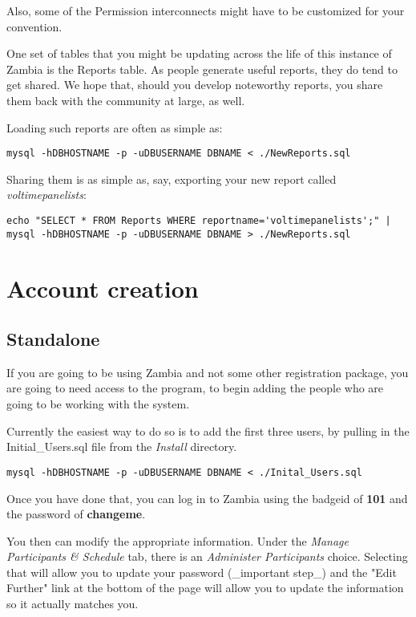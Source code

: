 \documentclass[captions=tablesignature]{scrartcl}
\begin{document}
Also, some of the Permission interconnects might have to be
customized for your convention.

One set of tables that you might be updating across the life of this
instance of Zambia is the Reports table.  As people generate useful
reports, they do tend to get shared.  We hope that, should you
develop noteworthy reports, you share them back with the community
at large, as well.

Loading such reports are often as simple as:
\begin{verbatim}
mysql -hDBHOSTNAME -p -uDBUSERNAME DBNAME < ./NewReports.sql
\end{verbatim}

Sharing them is as simple as, say, exporting your new report called
\emph{voltimepanelists}:
\begin{verbatim}
echo "SELECT * FROM Reports WHERE reportname='voltimepanelists';" |
mysql -hDBHOSTNAME -p -uDBUSERNAME DBNAME > ./NewReports.sql
\end{verbatim}
\section{Account creation}
\label{sec-7}
\subsection{Standalone}
\label{sec-7-1}
If you are going to be using Zambia and not some other registration
package, you are going to need access to the program, to begin
adding the people who are going to be working with the system.

Currently the easiest way to do so is to add the first three users,
by pulling in the Initial\_Users.sql file from the \emph{Install}
directory.

\begin{verbatim}
mysql -hDBHOSTNAME -p -uDBUSERNAME DBNAME < ./Inital_Users.sql
\end{verbatim}

Once you have done that, you can log in to Zambia using the badgeid
of \textbf{101} and the password of \textbf{changeme}.

You then can modify the appropriate information.  Under the \emph{Manage
Participants \& Schedule} tab, there is an \emph{Administer Participants}
choice.  Selecting that will allow you to update your password
(\_important step\_) and the "Edit Further" link at the bottom of
the page will allow you to update the information so it actually
matches you.
\end{document}
